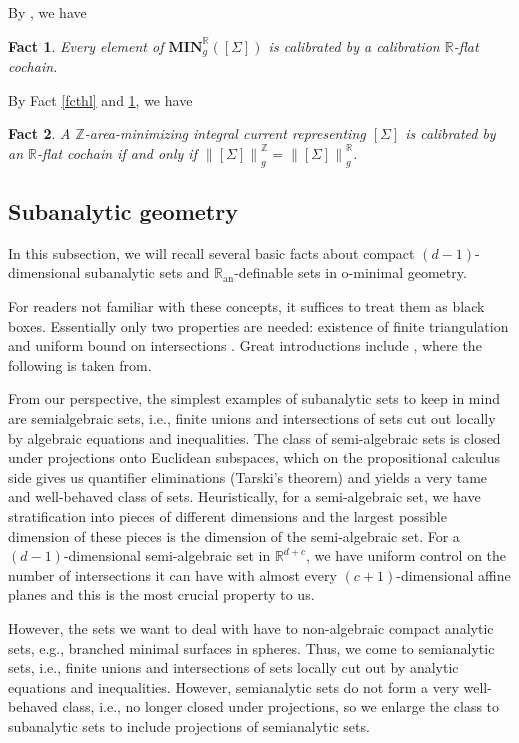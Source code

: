 \documentclass[11pt,a4paper]{amsart}
\numberwithin{equation}{section}
\newcommand{\mn}{\mathbf{MIN}}
\newcommand{\Si}{\Sigma}
\newcommand{\ran}{\mathbb{R}_{\operatorname{an}}}
\newcommand{\no}[1]{\left\lVert#1\right\rVert}
\newcommand{\R}{\mathbb{R}}
\newcommand{\Z}{\mathbb{Z}}
\theoremstyle{plain}
\newtheorem{fact}{Fact}[subsection]
\theoremstyle{definition}
\numberwithin{equation}{subsection}
\begin{document}
	By \cite[Section 4.12]{HFrf}, we have
	\begin{fact}\label{fctcalcc}
		Every element of $\mn_g^{\R}\left([\Si]\right)$ is calibrated by a calibration $\R$-flat cochain.
	\end{fact}	
	By Fact \ref{fcthl} and \ref{fctcalcc}, we have
	\begin{fact}\label{fctcal}
		A $\Z$-area-minimizing integral current representing $[\Si]$ is calibrated by an $\R$-flat cochain if and only if $\no{[\Si]}_g^{\Z}=\no{[\Si]}_g^{\R}$.
	\end{fact}
	\subsection{Subanalytic geometry}In this subsection, we will recall several basic facts about compact $(d-1)$-dimensional subanalytic sets and $\ran$-definable sets in o-minimal geometry. 
	
	For readers not familiar with these concepts, it suffices to treat them as black boxes. Essentially only two properties are needed: existence of finite triangulation \cite[Theorem 4.4]{MComin} and uniform bound on intersections \cite[Exercise 3.13]{MComin}. Great introductions include \cite{MComin,VDDom}, where the following is taken from.
	
	From our perspective, the simplest examples of subanalytic sets to keep in mind are semialgebraic sets, i.e., finite unions and intersections of sets cut out locally by algebraic equations and inequalities. The class of semi-algebraic sets is closed under projections onto Euclidean subspaces, which on the propositional calculus side gives us quantifier eliminations (Tarski's theorem) and yields a very tame and well-behaved class of sets. Heuristically, for a semi-algebraic set, we have stratification into pieces of different dimensions and the largest possible dimension of these pieces is the dimension of the semi-algebraic set. For a $(d-1)$-dimensional semi-algebraic set in $\R^{d+c}$, we have uniform control on the number of intersections it can have with almost every $(c+1)$-dimensional affine planes and this is the most crucial property to us.

However, the sets we want to deal with have to non-algebraic compact analytic sets, e.g., branched minimal surfaces in spheres. Thus, we come to semianalytic sets, i.e., finite unions and intersections of sets locally cut out by analytic equations and inequalities. However, semianalytic sets do not form a very well-behaved class, i.e., no longer closed under projections, so we enlarge the class to subanalytic sets \cite{BMsub} to include projections of semianalytic sets. 
\end{document}
